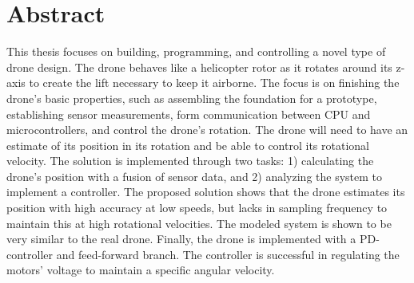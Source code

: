 \chapter{Abstract}
This thesis focuses on building, programming, and controlling a novel type of drone design. The drone behaves like a helicopter rotor as it rotates around its z-axis to create the lift necessary to keep it airborne. The focus is on finishing the drone's basic properties, such as assembling the foundation for a prototype, establishing sensor measurements, form communication between CPU and microcontrollers, and control the drone's rotation. The drone will need to have an estimate of its position in its rotation and be able to control its rotational velocity. The solution is implemented through two tasks: 1) calculating the drone's position with a fusion of sensor data, and 2) analyzing the system to implement a controller. The proposed solution shows that the drone estimates its position with high accuracy at low speeds, but lacks in sampling frequency to maintain this at high rotational velocities. The modeled system is shown to be very similar to the real drone. Finally, the drone is implemented with a PD-controller and feed-forward branch. The controller is successful in regulating the motors' voltage to maintain a specific angular velocity.